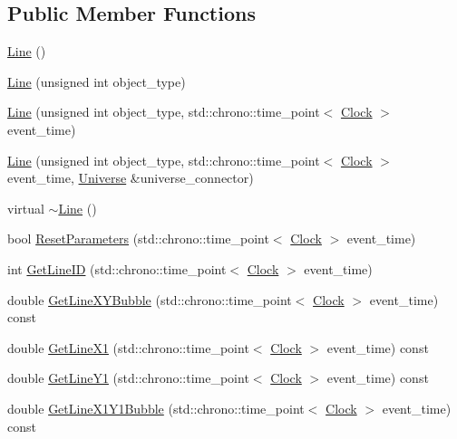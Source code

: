 \subsection*{Public Member Functions}
\begin{DoxyCompactItemize}
\item 
\hyperlink{class_line_acc11b8a429d8cdd63ba6803dff5602b3}{Line} ()
\item 
\hyperlink{class_line_a4e3242660d8d3c1aa43e932560840552}{Line} (unsigned int object\+\_\+type)
\item 
\hyperlink{class_line_a5330353765ab0f965a4293bdc7c3564a}{Line} (unsigned int object\+\_\+type, std\+::chrono\+::time\+\_\+point$<$ \hyperlink{universe_8h_a0ef8d951d1ca5ab3cfaf7ab4c7a6fd80}{Clock} $>$ event\+\_\+time)
\item 
\hyperlink{class_line_a740aacdf468a1519f9a01d9cbd1f9219}{Line} (unsigned int object\+\_\+type, std\+::chrono\+::time\+\_\+point$<$ \hyperlink{universe_8h_a0ef8d951d1ca5ab3cfaf7ab4c7a6fd80}{Clock} $>$ event\+\_\+time, \hyperlink{class_universe}{Universe} \&universe\+\_\+connector)
\item 
virtual \hyperlink{class_line_a4a95bafcefa28672b3999deb011b9e50}{$\sim$\+Line} ()
\item 
bool \hyperlink{class_line_af1756d1500ab0a5616313be6e213015a}{Reset\+Parameters} (std\+::chrono\+::time\+\_\+point$<$ \hyperlink{universe_8h_a0ef8d951d1ca5ab3cfaf7ab4c7a6fd80}{Clock} $>$ event\+\_\+time)
\item 
int \hyperlink{class_line_a20756feda4d42032955ec6cf12d89941}{Get\+Line\+ID} (std\+::chrono\+::time\+\_\+point$<$ \hyperlink{universe_8h_a0ef8d951d1ca5ab3cfaf7ab4c7a6fd80}{Clock} $>$ event\+\_\+time)
\item 
double \hyperlink{class_line_a8752cfce7330fbeda936778b77e534d0}{Get\+Line\+X\+Y\+Bubble} (std\+::chrono\+::time\+\_\+point$<$ \hyperlink{universe_8h_a0ef8d951d1ca5ab3cfaf7ab4c7a6fd80}{Clock} $>$ event\+\_\+time) const
\item 
double \hyperlink{class_line_ab14245ec4348e925b6e0f860e9254308}{Get\+Line\+X1} (std\+::chrono\+::time\+\_\+point$<$ \hyperlink{universe_8h_a0ef8d951d1ca5ab3cfaf7ab4c7a6fd80}{Clock} $>$ event\+\_\+time) const
\item 
double \hyperlink{class_line_ac09a53b36a300c38191269f110c73eb1}{Get\+Line\+Y1} (std\+::chrono\+::time\+\_\+point$<$ \hyperlink{universe_8h_a0ef8d951d1ca5ab3cfaf7ab4c7a6fd80}{Clock} $>$ event\+\_\+time) const
\item 
double \hyperlink{class_line_adc3c6c42d1b3d172e32fad59db2e3eaa}{Get\+Line\+X1\+Y1\+Bubble} (std\+::chrono\+::time\+\_\+point$<$ \hyperlink{universe_8h_a0ef8d951d1ca5ab3cfaf7ab4c7a6fd80}{Clock} $>$ event\+\_\+time) const

\end{DoxyCompactItemize}
